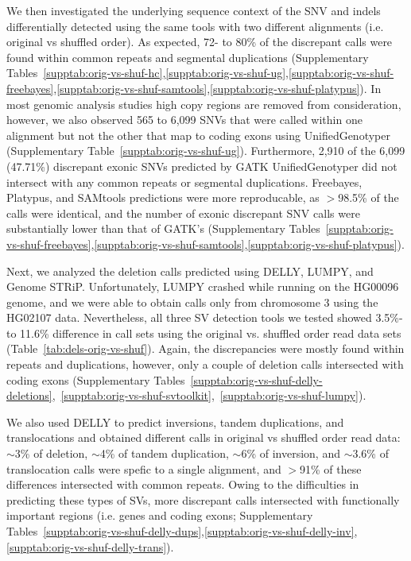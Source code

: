 \documentclass[10pt,a4paper]{article}
\begin{document}
We then investigated the underlying sequence context of the SNV and indels differentially detected using the same tools with two different alignments (i.e. original vs shuffled order). 
As expected, 72- to 80\% of the discrepant calls were found within common repeats and segmental duplications (Supplementary Tables~\ref{supptab:orig-vs-shuf-hc},\ref{supptab:orig-vs-shuf-ug},\ref{supptab:orig-vs-shuf-freebayes},\ref{supptab:orig-vs-shuf-samtools},\ref{supptab:orig-vs-shuf-platypus}). 
In most genomic analysis studies high copy regions are removed from consideration, however, we also observed 565 to 6,099 
SNVs that were called within one alignment but not the other that map to coding exons using UnifiedGenotyper (Supplementary Table~\ref{supptab:orig-vs-shuf-ug}). 
Furthermore, 2,910 of the 6,099 (47.71\%) discrepant exonic SNVs predicted by GATK UnifiedGenotyper did not intersect with any common repeats or segmental duplications.
Freebayes, Platypus, and SAMtools predictions were more reproducable, as $>$98.5\% of the calls were identical, and the number of exonic discrepant SNV calls were substantially lower than
that of GATK's (Supplementary Tables~\ref{supptab:orig-vs-shuf-freebayes},\ref{supptab:orig-vs-shuf-samtools},\ref{supptab:orig-vs-shuf-platypus}). 

Next, we analyzed the deletion calls predicted using DELLY, LUMPY, and Genome STRiP. Unfortunately, LUMPY crashed while running on the HG00096 genome, and we were able to obtain calls only from chromosome 3 using the HG02107 data. Nevertheless, all three SV detection tools we tested showed 3.5\%- to 11.6\% difference in call sets using the original vs. shuffled order read data sets (Table~\ref{tab:dels-orig-vs-shuf}). Again, the discrepancies were mostly found within repeats and duplications, however, only a couple of deletion calls intersected with coding exons (Supplementary Tables~\ref{supptab:orig-vs-shuf-delly-deletions},~\ref{supptab:orig-vs-shuf-svtoolkit},~\ref{supptab:orig-vs-shuf-lumpy}).

We also used DELLY to predict inversions, tandem duplications, and translocations and obtained different calls in original vs shuffled order read data: $\sim$3\% of deletion, $\sim$4\% of tandem duplication, $\sim$6\% of inversion, and $\sim$3.6\% of translocation calls were spefic to a single alignment, and $>$91\% of these differences intersected with common repeats. Owing to the difficulties in predicting
these types of SVs, more discrepant calls intersected with functionally important regions (i.e. genes and coding exons; Supplementary Tables~\ref{supptab:orig-vs-shuf-delly-dups},\ref{supptab:orig-vs-shuf-delly-inv},\ref{supptab:orig-vs-shuf-delly-trans}).
\end{document}
